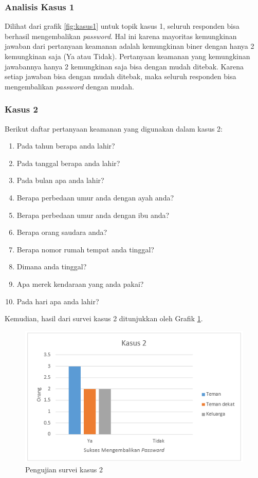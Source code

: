 \subsubsection{Analisis Kasus 1}

Dilihat dari grafik \ref{fig:kasus1} untuk topik kasus 1, seluruh responden bisa berhasil mengembalikan \textit{password}. Hal ini karena mayoritas kemungkinan jawaban dari pertanyaan keamanan adalah kemungkinan biner dengan hanya 2 kemungkinan saja (Ya atau Tidak). Pertanyaan keamanan yang kemungkinan jawabannya hanya 2 kemungkinan saja bisa dengan mudah ditebak. Karena setiap jawaban bisa dengan mudah ditebak, maka seluruh responden bisa mengembalikan \textit{password} dengan mudah.

\subsubsection{Kasus 2}

Berikut daftar pertanyaan keamanan yang digunakan dalam kasus 2:

\begin{enumerate}[itemsep=0mm]
	\item Pada tahun berapa anda lahir?
	\item Pada tanggal berapa anda lahir?
	\item Pada bulan apa anda lahir?
	\item Berapa perbedaan umur anda dengan ayah anda?
	\item Berapa perbedaan umur anda dengan ibu anda?
	\item Berapa orang saudara anda?
	\item Berapa nomor rumah tempat anda tinggal?
	\item Dimana anda tinggal?
	\item Apa merek kendaraan yang anda pakai?
	\item Pada hari apa anda lahir?
\end{enumerate}

Kemudian, hasil dari survei kasus 2 ditunjukkan oleh Grafik \ref{fig:kasus2}.

\begin{figure}[H]
	\includegraphics[scale=0.8]{Gambar/kasus2}
	\centering
	\caption{Pengujian survei kasus 2}\label{fig:kasus2}
\end{figure}

